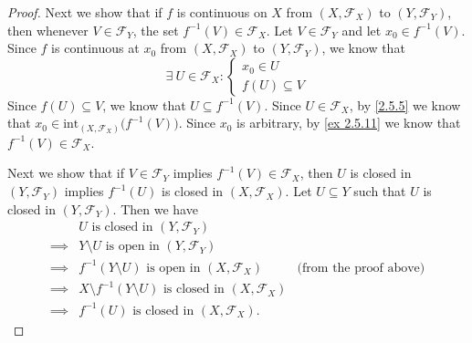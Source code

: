 \begin{proof}
  Next we show that if \(f\) is continuous on \(X\) from \((X, \mathcal{F}_X)\) to \((Y, \mathcal{F}_Y)\), then whenever \(V \in \mathcal{F}_Y\), the set \(f^{-1}(V) \in \mathcal{F}_X\).
  Let \(V \in \mathcal{F}_Y\) and let \(x_0 \in f^{-1}(V)\).
  Since \(f\) is continuous at \(x_0\) from \((X, \mathcal{F}_X)\) to \((Y, \mathcal{F}_Y)\), we know that
  \[
    \exists\ U \in \mathcal{F}_X : \begin{cases}
      x_0 \in U \\
      f(U) \subseteq V
    \end{cases}
  \]
  Since \(f(U) \subseteq V\), we know that \(U \subseteq f^{-1}(V)\).
  Since \(U \in \mathcal{F}_X\), by \cref{2.5.5} we know that \(x_0 \in \text{int}_{(X, \mathcal{F}_X)}\big(f^{-1}(V)\big)\).
  Since \(x_0\) is arbitrary, by \cref{ex 2.5.11} we know that \(f^{-1}(V) \in \mathcal{F}_X\).

  Next we show that if \(V \in \mathcal{F}_Y\) implies \(f^{-1}(V) \in \mathcal{F}_X\), then \(U\) is closed in \((Y, \mathcal{F}_Y)\) implies \(f^{-1}(U)\) is closed in \((X, \mathcal{F}_X)\).
  Let \(U \subseteq Y\) such that \(U\) is closed in \((Y, \mathcal{F}_Y)\).
  Then we have
  \begin{align*}
             & U \text{ is closed in } (Y, \mathcal{F}_Y)                                                                 \\
    \implies & Y \setminus U \text{ is open in } (Y, \mathcal{F}_Y)                                                       \\
    \implies & f^{-1}(Y \setminus U) \text{ is open in } (X, \mathcal{F}_X)               & \text{(from the proof above)} \\
    \implies & X \setminus f^{-1}(Y \setminus U) \text{ is closed in } (X, \mathcal{F}_X)                                 \\
    \implies & f^{-1}(U) \text{ is closed in } (X, \mathcal{F}_X).
  \end{align*}


\end{proof}
